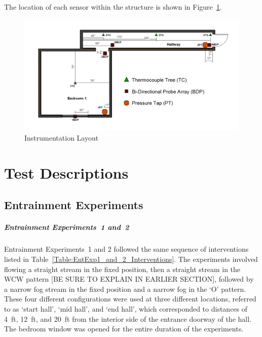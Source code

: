 \documentclass[12pt,oneside]{book}
\begin{document}
The location of each sensor within the structure is shown in Figure~\ref{fig:InstrumentDim}.

\begin{figure}[H]
	\centering
	\includegraphics[width=\textwidth]{Figures/Instrumentation/Instrument_Dimensions.png}
	\caption{Instrumentation Layout}
	\label{fig:InstrumentDim}
\end{figure}

\clearpage

\chapter{Test Descriptions}

\section*{Entrainment Experiments}

\paragraph{Entrainment Experiments~1 and~2} \mbox{}

Entrainment Experiments~1 and 2 followed the same sequence of interventions listed in Table~\ref{Table:EntExp1_and_2_Interventions}. The experiments involved flowing a straight stream in the fixed position, then a straight stream in the WCW pattern [BE SURE TO EXPLAIN IN EARLIER SECTION], followed by a narrow fog stream in the fixed position and a narrow fog in the `O' pattern. These four different configurations were used at three different locations, referred to as `start hall', `mid hall', and `end hall', which corresponded to distances of 4~ft, 12~ft, and 20~ft from the interior side of the entrance doorway of the hall. The bedroom window was opened for the entire duration of the experiments.
\end{document}
